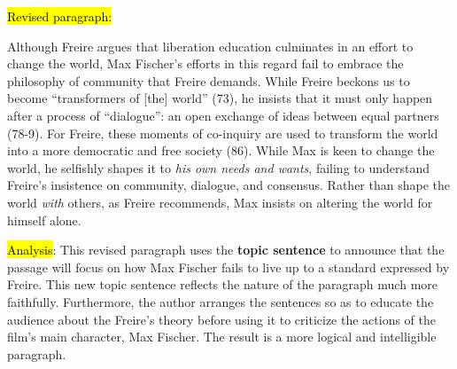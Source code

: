\bigskip

\begin{tcolorbox}[enhanced,width=4.2in,left=.3in, right=.3in,
   drop fuzzy shadow southeast,
    boxrule=0.4pt,sharp corners,colframe=black!80!black,colback=white!10]

\medskip

{\small
\begin{doublespacing}

\hl{Revised paragraph:}\medskip

\hspace{.5cm}Although Freire argues that liberation education culminates in an effort to change the world, Max Fischer's efforts in this regard fail to embrace the philosophy of community that Freire demands. While Freire beckons us to become “transformers of [the] world” (73), he insists that it must only happen after a process of “dialogue”: an open exchange of ideas between equal partners (78-9). For Freire, these moments of co-inquiry are used to transform the world into a more democratic and free society (86). While Max is keen to change the world, he selfishly shapes it to \emph{his own needs and wants}, failing to understand Freire's insistence on community, dialogue, and consensus. Rather than shape the world \emph{with} others, as Freire recommends, Max insists on altering the world for himself alone.

\medskip

\end{doublespacing}}

\end{tcolorbox}

\hl{Analysis}: This revised paragraph uses the \textbf{topic sentence} to announce that the passage will focus on how Max Fischer fails to live up to a standard expressed by Freire. This new topic sentence reflects the nature of the paragraph much more faithfully. Furthermore, the author arranges the sentences so as to educate the audience about the Freire's theory before using it to criticize the actions of the film's main character, Max Fischer. The result is a more logical and intelligible paragraph.
